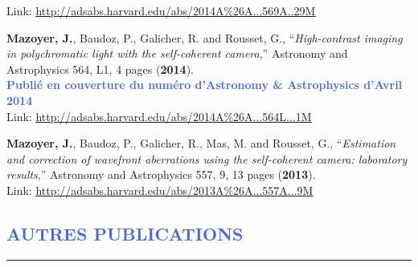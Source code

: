 \documentclass[11pt,a4paper, french]{article}
\begin{document}
\begin{etaremune}
Link: \textcolor{BrickRed}{\underline{\url{http://adsabs.harvard.edu/abs/2014A\%26A...569A..29M}}}
\item \textbf{Mazoyer, J.}, Baudoz, P., Galicher, R. and Rousset, G., “\textit{High-contrast imaging in polychromatic light with the self-coherent camera},” Astronomy and Astrophysics 564, L1, 4 pages (\textbf{2014}).\\
\textcolor{RoyalBlue}{\textbf{Publié en couverture du numéro d'Astronomy \& Astrophysics d'Avril 2014}}\\
Link: \textcolor{BrickRed}{\underline{\url{http://adsabs.harvard.edu/abs/2014A\%26A...564L...1M}}}
\item \textbf{Mazoyer, J.}, Baudoz, P., Galicher, R., Mas, M. and Rousset, G., “\textit{Estimation and correction of wavefront aberrations using the self-coherent camera: laboratory results},” Astronomy and Astrophysics 557, 9, 13 pages (\textbf{2013}).\\
Link: \textcolor{BrickRed}{\underline{\url{http://adsabs.harvard.edu/abs/2013A\%26A...557A...9M}}}


\end{etaremune}

\vspace{-0.45cm}
\textcolor{RoyalBlue}{\section{\large AUTRES PUBLICATIONS}
\vspace{-0.2cm}\hrule}
\vspace{0.4cm}
\end{document}
